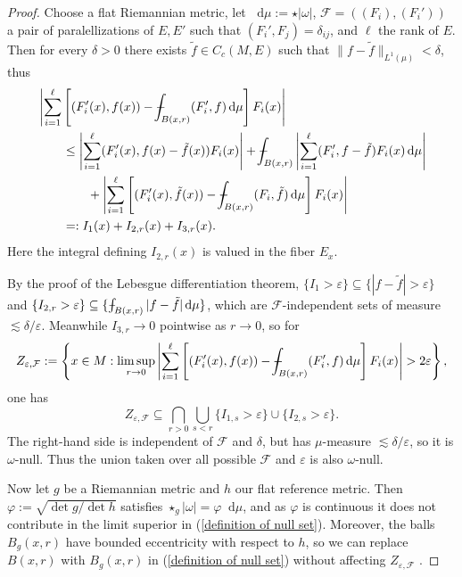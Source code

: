 \documentclass[reqno,11pt]{amsart}
\newcommand*\dif{\mathop{}\!\mathrm{d}}
\theoremstyle{definition}
\numberwithin{equation}{section}
\def\Xint#1{\mathchoice
{\XXint\displaystyle\textstyle{#1}}%
{\XXint\textstyle\scriptstyle{#1}}%
{\XXint\scriptstyle\scriptscriptstyle{#1}}%
{\XXint\scriptscriptstyle\scriptscriptstyle{#1}}%
\!\int}
\def\XXint#1#2#3{{\setbox0=\hbox{$#1{#2#3}{\int}$ }
\vcenter{\hbox{$#2#3$ }}\kern-.6\wd0}}
\def\dashint{\Xint-}
\begin{document}
\begin{proof}
Choose a flat Riemannian metric, let $\dif \mu := \star |\omega|$, $\mathcal F = ((F_i), (F_i'))$ a pair of paralellizations of $E, E'$ such that $(F_i', F_j) = \delta_{ij}$, and $\ell$ the rank of $E$.
Then for every $\delta > 0$ there exists $\tilde f \in C_c(M, E)$ such that $\|f - \tilde f\|_{L^1(\mu)} < \delta$, thus
\begin{align*}
&\left|\sum_{i=1}^\ell \left[(F_i'(x), f(x)) - \dashint_{B(x, r)} (F_i', f) \dif \mu\right] F_i(x)\right| \\
&\qquad \leq \left|\sum_{i=1}^\ell (F_i'(x), f(x) - \tilde f(x)) F_i(x)\right| + \dashint_{B(x, r)} \left|\sum_{i=1}^\ell (F_i', f - \tilde f)F_i(x) \dif \mu \right| \\
&\qquad \qquad + \left|\sum_{i=1}^\ell \left[(F_i'(x), \tilde f(x)) - \dashint_{B(x, r)} (F_i, \tilde f) \dif \mu\right] F_i(x)\right| \\
&\qquad =: I_1(x) + I_{2, r}(x) + I_{3, r}(x).
\end{align*}
Here the integral defining $I_{2, r}(x)$ is valued in the fiber $E_x$.

By the proof of the Lebesgue differentiation theorem, $\{I_1 > \varepsilon\} \subseteq \{|f - \tilde f| > \varepsilon\}$ and $\{I_{2, r} > \varepsilon\} \subseteq \{\dashint_{B(x, r)} |f - \tilde f|\dif \mu\}$, which are $\mathcal F$-independent sets of measure $\lesssim \delta/\varepsilon$.
Meanwhile $I_{3, r} \to 0$ pointwise as $r \to 0$, so for
\begin{equation}\label{definition of null set}
Z_{\varepsilon, \mathcal F} := \left\{x \in M: \limsup_{r \to 0} \left|\sum_{i=1}^\ell \left[(F_i'(x), f(x)) - \dashint_{B(x, r)} (F_i', f) \dif \mu\right] F_i(x)\right| > 2\varepsilon\right\},
\end{equation}
one has
$$Z_{\varepsilon, \mathcal F} \subseteq \bigcap_{r > 0}\bigcup_{s <r} \{I_{1, s} > \varepsilon\} \cup \{I_{2, s} > \varepsilon\}.$$
The right-hand side is independent of $\mathcal F$ and $\delta$, but has $\mu$-measure $\lesssim \delta/\varepsilon$, so it is $\omega$-null.
Thus the union taken over all possible $\mathcal F$ and $\varepsilon$ is also $\omega$-null.

Now let $g$ be a Riemannian metric and $h$ our flat reference metric.
Then $\varphi := \sqrt{\det g/\det h}$ satisfies $\star_g|\omega| = \varphi \dif \mu$, and as $\varphi$ is continuous it does not contribute in the limit superior in (\ref{definition of null set}).
Moreover, the balls $B_g(x, r)$ have bounded eccentricity with respect to $h$, so we can replace $B(x, r)$ with $B_g(x, r)$ in (\ref{definition of null set}) without affecting $Z_{\varepsilon, \mathcal F}$ \cite[Chapter 3, Corollary 1.7]{stein2009real}.
\end{proof}
\end{document}
